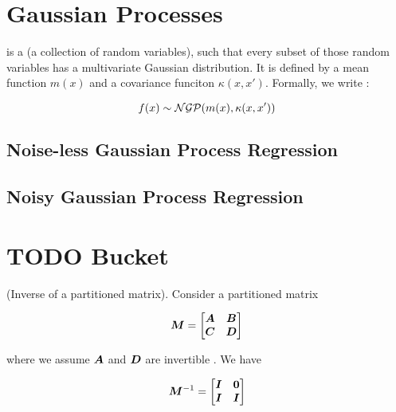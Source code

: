
\chapter{Gaussian Processes}

 is a  (a collection of random variables), such that every subset of those random variables has a multivariate Gaussian distribution. It is defined by a mean function $m(x)$ and a covariance funciton $\kappa(x, x')$. Formally, we write :

\begin{equation}
f(x) \sim {\mathcal{N}} {\mathcal{G}} {\mathcal{P}} (m(x), \kappa(x, x'))
\end{equation} 


\section{Noise-less Gaussian Process Regression}

\section{Noisy Gaussian Process Regression}



\chapter{TODO Bucket}


\begin{thm} (Inverse of a partitioned matrix). Consider a partitioned matrix

\begin{equation}
{\bm{M}} = \begin{bmatrix} {\bm{A}} & {\bm{B}} \\ {\bm{C}} & {\bm{D}} \end{bmatrix}
\end{equation}

where we assume ${\bm{A}}$ and ${\bm{D}}$ are invertible . We have

\begin{equation}
{\bm{M}}^{-1} = \begin{bmatrix} {\bm{I}} & {\bm{0}} \\ {\bm{I}} & {\bm{I}} \end{bmatrix}
\end{equation}
\end{thm}

